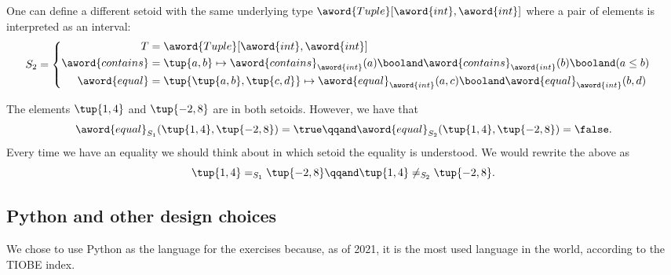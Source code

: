 One can define a different setoid with the same underlying type $\aword{Tuple}[\aword{int}, \aword{int}]$ where a pair of elements is interpreted as an interval:
\begin{equation}
    S_2 =
    \begin{cases}
        \begin{aligned}
            T                & = \aword{Tuple}[\aword{int}, \aword{int}] \\
            \aword{contains} & = \tup{a,b} \mapsto
            \aword{contains}_{\aword{int}}(a)
            \booland
            \aword{contains}_{\aword{int}}(b)
            \booland
            (a\leq b) \\
            \aword{equal}    & = \tup{\tup{a,b}, \tup{c,d}}
            \mapsto
            \aword{equal}_{\aword{int}}(a,c)
            \booland
            \aword{equal}_{\aword{int}}(b,d)
        \end{aligned}
    \end{cases}
\end{equation}

The elements $\tup{1,4}$ and $\tup{-2, 8}$ are in both setoids.
However, we have that
\begin{equation}
    \aword{equal}_{S_1} (\tup{1,4}, \tup{-2, 8}) = \true
    \qqand
    \aword{equal}_{S_2} (\tup{1,4}, \tup{-2, 8}) = \false .
\end{equation}
Every time we have an equality we should think about in which setoid the equality is understood.
We would rewrite the above as
\begin{equation}
    \tup{1,4} =_{S_1} \tup{-2, 8}
    \qqand
    \tup{1,4} \neq_{S_2} \tup{-2, 8}.
\end{equation}

\subsection{Python and other design choices}

We chose to use Python as the language for the exercises because, as of 2021, it is the most used language in the world, according to the TIOBE index.

